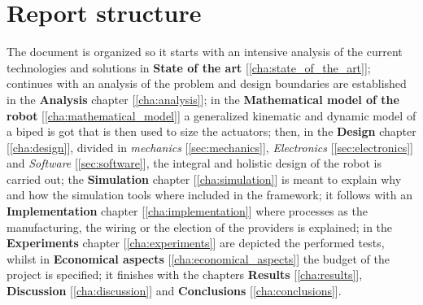 \section{Report structure}
\label{sec:report_structure}
The document is organized so it starts with an intensive analysis of the current technologies and solutions in \textbf{State of the art} [\ref{cha:state_of_the_art}]; continues with an analysis of the problem and design boundaries are established in the \textbf{Analysis} chapter [\ref{cha:analysis}]; in the \textbf{Mathematical model of the robot} [\ref{cha:mathematical_model}] a generalized kinematic and dynamic model of a biped is got that is then used to size the actuators; then, in  the \textbf{Design} chapter [\ref{cha:design}], divided in \textit{mechanics} [\ref{sec:mechanics}], \textit{Electronics} [\ref{sec:electronics}] and \textit{Software} [\ref{sec:software}], the integral and holistic design of the robot is carried out; the \textbf{Simulation} chapter [\ref{cha:simulation}] is meant to explain why and how the simulation tools where included in the framework; it follows with an \textbf{Implementation} chapter [\ref{cha:implementation}] where processes as the manufacturing, the wiring or the election of the providers is explained; in the \textbf{Experiments} chapter [\ref{cha:experiments}] are depicted the performed tests, whilst in \textbf{Economical aspects} [\ref{cha:economical_aspects}] the budget of the project is specified; it finishes with the chapters \textbf{Results} [\ref{cha:results}], \textbf{Discussion} [\ref{cha:discussion}] and \textbf{Conclusions} [\ref{cha:conclusions}].